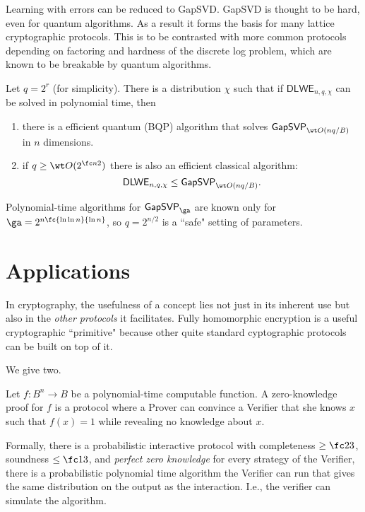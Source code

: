 Learning with errors can be reduced to GapSVD. GapSVD is thought to be hard, even for quantum algorithms. As a result it forms the basis for many lattice cryptographic protocols. This is to be contrasted with more common protocols depending on factoring and hardness of the discrete log problem, which are known to be breakable by quantum algorithms.

\begin{thm}
Let $q=2^r$ (for simplicity). There is a distribution $\chi$ such that if $\mathsf{DLWE}_{n,q,\chi}$ can be solved in polynomial time, then
\begin{enumerate}
\item
there is a efficient quantum (BQP) algorithm that solves $\mathsf{GapSVP}_{\wt O(nq/B)}$ in $n$ dimensions.
\item
if $q\ge \wt O(2^{\fc n2})$ there is also an efficient classical algorithm:
\[
\mathsf{DLWE}_{n,q,\chi}\le \mathsf{GapSVP}_{\wt O(nq/B)}.
\]
\end{enumerate}
\end{thm}
Polynomial-time algorithms for $\mathsf{GapSVP}_{\ga}$ are known only for $\ga=2^{n\fc{\ln\ln n}{\ln n}}$, so $q=2^{n/2}$ is a ``safe" setting of parameters.

\section{Applications}
In cryptography, the usefulness of a concept lies not just in its inherent use but also in the {\it other protocols} it facilitates. 
Fully homomorphic encryption is a useful cryptographic ``primitive" because other quite standard cyptographic protocols can be built on top of it.

We give two.


\begin{df}
Let $f:B^n\to B$ be a polynomial-time computable function. 
A zero-knowledge proof for $f$ %
is a protocol where a Prover can convince a Verifier that she knows $x$ such that $f(x)=1$ while revealing no knowledge about $x$.

Formally, there is a probabilistic interactive protocol with completeness $\ge \fc23$, soundness $\le \fc13$, and {\it perfect zero knowledge} for every strategy of the Verifier, there is a probabilistic polynomial time algorithm the Verifier can run that gives the same distribution on the output as the interaction. I.e., the verifier can simulate the algorithm.
\end{df}

